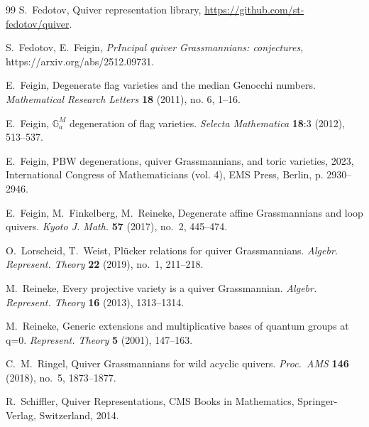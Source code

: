\documentclass{amsart}
\numberwithin{equation}{section}
\theoremstyle{remark}
\begin{document}
\begin{thebibliography}{99}
S.~Fedotov,
Quiver representation library, \href{https://github.com/st-fedotov/quiver}
{https://github.com/st-fedotov/quiver}.

S.~Fedotov, E.~Feigin, \emph{PrIncipal quiver Grassmannians: conjectures}, https://arxiv.org/abs/2512.09731.

E.~Feigin,  Degenerate flag varieties and the median Genocchi numbers.
\emph{Mathematical Research Letters} \textbf{18} (2011), no. 6, 1--16.


{E.~Feigin}, ${\mathbb G}_a^M$ degeneration of flag varieties.
\emph{Selecta Mathematica} \textbf{18}:3 (2012), 513--537.


E.~Feigin, 
PBW degenerations, quiver Grassmannians, and toric varieties,
2023, International Congress of Mathematicians (vol. 4), EMS Press, Berlin, p. 2930--2946.


E.~Feigin, M.~Finkelberg, M.~Reineke, 
Degenerate affine Grassmannians and loop quivers. 
\emph{Kyoto J. Math.} \textbf{57} (2017), no.~2, 445--474. 


O.~Lorscheid, T.~Weist, Pl\"ucker relations for quiver Grassmannians. \emph{Algebr. Represent. Theory} \textbf{22} (2019), no.~1, 211--218.



M.~Reineke, Every projective variety is a quiver Grassmannian. \emph{Algebr. Represent. Theory} \textbf{16} (2013), 1313--1314. 

M.~Reineke, Generic extensions and multiplicative bases of quantum groups at q=0. \emph{Represent. Theory} \textbf{5} (2001), 147--163. 


C.~M.~Ringel, Quiver Grassmannians for wild acyclic quivers.  \emph{Proc.~AMS} \textbf{146} (2018), no.~5, 1873--1877. 

R.~Schiffler, Quiver Representations, CMS Books in Mathematics, Springer-Verlag, 
Switzerland, 2014.




\end{thebibliography}
\end{document}
